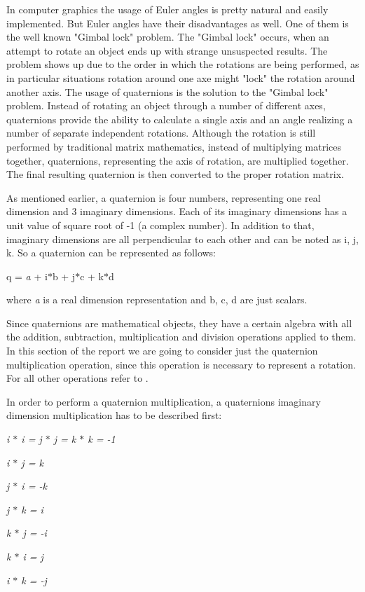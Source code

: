 \documentclass[times, 10pt,twocolumn]{article}
\begin{document}
In computer graphics the usage of Euler angles is pretty natural and easily implemented. But Euler angles have their disadvantages as well. One of them is the well known "Gimbal lock" problem.  The "Gimbal lock" occurs, when an attempt to rotate an object ends up with strange unsuspected results. The problem shows up due to the order in which the rotations are being performed, as in particular situations rotation around one axe might "lock" the rotation around another axis. The usage of quaternions is the solution to the "Gimbal lock" problem. Instead of rotating an object through a number of different axes, quaternions provide the ability to calculate a single axis and an angle realizing a number of separate independent rotations. Although the rotation is still performed by traditional matrix mathematics, instead of multiplying matrices together, quaternions, representing the axis of rotation, are multiplied together. The final resulting quaternion is then converted to the proper rotation matrix.

As mentioned earlier, a quaternion is four numbers, representing one real dimension and 3 imaginary dimensions. Each of its imaginary dimensions has a unit value of square root of -1 (a complex number). In addition to that, imaginary dimensions are all perpendicular to each other and can be noted as i, j, k. So a quaternion can be represented as follows:
\begin{center}
q = \emph{a} + i$\ast$b + j$\ast$c + k$\ast$d
\end{center}
where \emph{a} is a real dimension representation and b,  c,  d are just scalars.

Since quaternions are mathematical objects, they have a certain algebra with all the addition, subtraction,  multiplication and division operations applied to them. In this section of the report we are going to consider just the quaternion multiplication operation, since this operation is necessary to represent a rotation. For all other operations refer to \cite{ex16}.

In order to perform a quaternion multiplication, a quaternions imaginary dimension multiplication has to be described first:

\begin{description}
    \setlength{\itemsep}{0pt}

    \item \emph{i $\ast$ i = j $\ast$ j = k $\ast$ k = -1}
    \item \emph{i $\ast$ j = k}
    \item \emph{j $\ast$ i = -k}
    \item \emph{j $\ast$ k = i}
    \item \emph{k $\ast$ j = -i}
    \item \emph{k $\ast$ i =  j}
    \item \emph{i $\ast$ k = -j}
\end{description}
\end{document}
